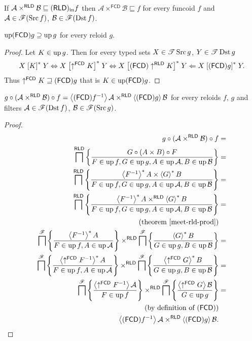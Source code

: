 \begin{conjecture}
If $\mathcal{A}\times^{\mathsf{RLD}}\mathcal{B}\sqsubseteq(\mathsf{RLD})_{\mathrm{in}} f$
then $\mathcal{A}\times^{\mathsf{FCD}}\mathcal{B}\sqsubseteq f$ for
every funcoid $f$ and $\mathcal{A}\in\mathscr{F}(\operatorname{Src} f)$, $\mathcal{B}\in\mathscr{F}(\operatorname{Dst} f)$.\end{conjecture}
\begin{thm}
$\operatorname{up}(\mathsf{FCD}) g\supseteq\operatorname{up} g$ for every reloid $g$.\end{thm}
\begin{proof}
Let $K\in\operatorname{up} g$. Then for every typed sets $X\in\mathscr{T}\operatorname{Src} g$, $Y\in\mathscr{T}\operatorname{Dst} g$
\[
X\mathrel{\left[K\right]^{\ast}}Y\Leftrightarrow X\mathrel{\left[\uparrow^{\mathsf{FCD}}K\right]^{\ast}}Y\Leftrightarrow X\mathrel{\left[(\mathsf{FCD})\uparrow^{\mathsf{RLD}}K\right]^{\ast}}Y\Leftarrow X\mathrel{\left[(\mathsf{FCD}) g\right]^{\ast}}Y.
\]
Thus $\uparrow^{\mathsf{FCD}}K\sqsupseteq(\mathsf{FCD}) g$ that is $K\in\operatorname{up}(\mathsf{FCD}) g$.\end{proof}
\begin{thm}
$g\circ(\mathcal{A}\times^{\mathsf{RLD}}\mathcal{B})\circ f=\left\langle (\mathsf{FCD}) f^{-1}\right\rangle\mathcal{A}\times^{\mathsf{RLD}}\left\langle (\mathsf{FCD}) g\right\rangle\mathcal{B}$
for every reloids $f$, $g$ and filters $\mathcal{A}\in\mathscr{F}(\operatorname{Dst} f)$,
$\mathcal{B}\in\mathscr{F}(\operatorname{Src} g)$.\end{thm}
\begin{proof}
~
\begin{align*}
g\circ(\mathcal{A}\times^{\mathsf{RLD}}\mathcal{B})\circ f & =\\
\bigsqcap^{\mathsf{RLD}}\left\{ \frac{G\circ(A\times B)\circ F}{F\in\operatorname{up} f,G\in\operatorname{up} g,A\in\operatorname{up}\mathcal{A},B\in\operatorname{up}\mathcal{B}}\right\} & =\\
\bigsqcap^{\mathsf{RLD}}\left\{ \frac{\left\langle F^{-1}\right\rangle ^{\ast}A\times\left\langle G\right\rangle ^{\ast}B}{F\in\operatorname{up} f,G\in\operatorname{up} g,A\in\operatorname{up}\mathcal{A},B\in\operatorname{up}\mathcal{B}}\right\} & =\\
\bigsqcap^{\mathsf{RLD}}\left\{ \frac{\left\langle F^{-1}\right\rangle ^{\ast}A\times^{\mathsf{RLD}}\left\langle G\right\rangle ^{\ast}B}{F\in\operatorname{up} f,G\in\operatorname{up} g,A\in\operatorname{up}\mathcal{A},B\in\operatorname{up}\mathcal{B}}\right\} & =\\
\text{(theorem \ref{meet-rld-prod})}\\
\bigsqcap^{\mathscr{F}}\left\{ \frac{\left\langle F^{-1}\right\rangle ^{\ast}A}{F\in\operatorname{up} f,A\in\operatorname{up}\mathcal{A}}\right\}\times^{\mathsf{RLD}}\bigsqcap^{\mathscr{F}}\left\{ \frac{\left\langle G\right\rangle ^{\ast}B}{G\in\operatorname{up} g,B\in\operatorname{up}\mathcal{B}}\right\} & =\\
\bigsqcap^{\mathscr{F}}\left\{ \frac{\left\langle \uparrow^{\mathsf{FCD}}F^{-1}\right\rangle ^{\ast}A}{F\in\operatorname{up} f,A\in\operatorname{up}\mathcal{A}}\right\}\times^{\mathsf{RLD}}\bigsqcap^{\mathscr{F}}\left\{ \frac{\left\langle \uparrow^{\mathsf{FCD}}G\right\rangle ^{\ast}B}{G\in\operatorname{up} g,B\in\operatorname{up}\mathcal{B}}\right\} & =\\
\bigsqcap^{\mathscr{F}}\left\{ \frac{\left\langle \uparrow^{\mathsf{FCD}}F^{-1}\right\rangle\mathcal{A}}{F\in\operatorname{up} f}\right\}\times^{\mathsf{RLD}}\bigsqcap^{\mathscr{F}}\left\{ \frac{\left\langle \uparrow^{\mathsf{FCD}}G\right\rangle\mathcal{B}}{G\in\operatorname{up} g}\right\} & =\\
\text{(by definition of \ensuremath{(\mathsf{FCD})})} & \text{}\\
\left\langle (\mathsf{FCD}) f^{-1}\right\rangle\mathcal{A}\times^{\mathsf{RLD}}\left\langle (\mathsf{FCD}) g\right\rangle\mathcal{B}.
\end{align*}
\end{proof}

